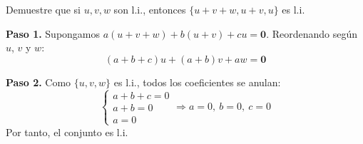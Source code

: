 \begin{prob} Demuestre que si $u,v,w$ son l.i., entonces $\{u+v+w, u+v, u\}$ es l.i.

\begin{myproof}
\textbf{Paso 1.} Supongamos $a(u+v+w) + b(u+v) + c u = \mathbf{0}$. Reordenando según $u$, $v$ y $w$:
$$(a + b + c)u + (a + b)v + a w = \mathbf{0}$$

\textbf{Paso 2.} Como $\{u,v,w\}$ es l.i., todos los coeficientes se anulan:
$$\begin{cases} a + b + c = 0 \\ a + b = 0 \\ a = 0 \end{cases} \Rightarrow a=0,\ b=0,\ c=0$$
Por tanto, el conjunto es l.i.
\end{myproof}
\end{prob}

